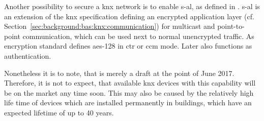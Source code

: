 Another possibility to secure a \gls{knx} network is to enable \gls{s-al}, as defined in \textcite{DIN_EN_50090-3-4}. \Gls{s-al} is an extension of the \gls{knx} specification defining an encrypted application layer (cf. Section~\ref{sec:background:bas:knx:communication}) for multicast and point-to-point communication, which can be used next to normal unencrypted traffic.
As encryption standard \textcite{DIN_EN_50090-3-4} defines \acs{aes}-128 in \gls{ctr} or \gls{ccm} mode.
Later also functions as authentication. 

Nonetheless it is to note, that \textcite{DIN_EN_50090-3-4} is merely a draft at the point of June 2017.
Therefore, it is not to expect, that available \gls{knx} devices with this capability will be on the market any time soon. This may also be caused by the relatively high life time of devices which are installed permanently in buildings, which have an expected lifetime of up to 40 years.



